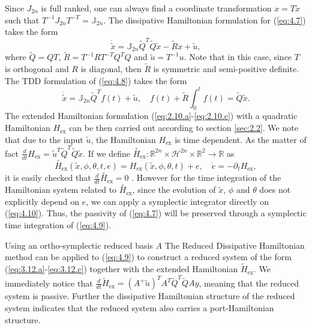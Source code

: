 Since $J_{2n}$ is full ranked, one can always find a coordinate transformation $ x= T \tilde x$ such that $T^{-1} J_{2n} T^{-T} = \mathbb J_{2n}$. The dissipative Hamiltonian formulation for (\ref{eq:4.7}) takes the form
\begin{equation} \label{eq:4.8}
	\dot {\tilde x} = \mathbb J_{2n} \tilde Q^T\tilde Q \tilde x - \tilde Rx + \tilde u,
\end{equation}
where $\tilde Q = QT$, $\tilde R = T^{-1}RT^{-T}Q^TQ$ and $\tilde u = T^{-1} u$. Note that in this case, since $T$ is orthogonal and $R$ is diagonal, then $\tilde R$ is symmetric and semi-positive definite. The TDD formulation of (\ref{eq:4.8}) takes the form
\begin{equation} \label{eq:4.9}
	\dot{\tilde x} = \mathbb{J}_{2n} \tilde Q^T f(t) + \tilde u, \quad f(t) + \tilde R \int_0^t f(t) = \tilde Q \tilde x.
\end{equation}
The extended Hamiltonian formulation (\ref{eq:2.10.a}-\ref{eq:2.10.c}) with a quadratic Hamiltonian $H_{\text{ex}}$ can be then carried out according to section \ref{sec:2.2}. We note that due to the input $\tilde u$, the Hamiltonian $H_{\text{ex}}$ is time dependent. As the matter of fact $\frac{d}{dt} H_{\text{ex}} = \tilde u^T\tilde Q^T \tilde Q \tilde x$. If we define $\overset{\circ}{H}_{\text{ex}} : \mathbb R^{2n}\times \mathcal H^{2n}\times \mathbb R^{2}\to \mathbb R$ as
\begin{equation} \label{eq:4.10}
	\overset{\circ}{H}_{\text{ex}}(\tilde x,\phi,\theta,t,e) = H_{\text{ex}}(\tilde x,\phi,\theta,t) + e, \quad \dot e = - \partial_t H_{\text{ex}},
\end{equation}
it is easily checked that $\frac d {dt} \overset{\circ}{H}_{\text{ex}} =0$ \cite{Hairer:1250576}. However for the time integration of the Hamiltonian system related to $\overset{\circ}{H}_{\text{ex}}$, since the evolution of $\tilde x$, $\phi$ and $\theta$ does not explicitly depend on $e$, we can apply a symplectic integrator directly on (\ref{eq:4.10}). Thus, the passivity of (\ref{eq:4.7}) will be preserved through a symplectic time integration of (\ref{eq:4.9}).

Using an ortho-symplectic reduced basis $A$ The Reduced Dissipative Hamiltonian method can be applied to (\ref{eq:4.9}) to construct a reduced system of the form (\ref{eq:3.12.a}-\ref{eq:3.12.c}) together with the extended Hamiltonian $\tilde H_{\text{ex}}$. We immediately notice that $\frac{d}{dt} \tilde H_{\text{ex}} = (A^+ \tilde u)^T A^T \tilde Q^T \tilde Q A y$, meaning that the reduced system is passive. Further the dissipative Hamiltonian structure of the reduced system indicates that the reduced system also carries a port-Hamiltonian structure.

